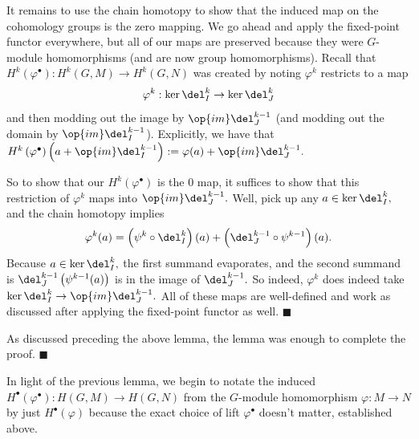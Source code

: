 It remains to use the chain homotopy to show that the induced map on the cohomology groups is the zero mapping. We go ahead and apply the fixed-point functor everywhere, but all of our maps are preserved because they were $G$-module homomorphisms (and are now group homomorphisms). Recall that $H^k\left(\varphi^\bullet\right):H^k(G,M)\to H^k(G,N)$ was created by noting $\varphi^k$ restricts to a map
\[\varphi^k:\ker\del_I^k\to\ker\del_J^k\]
and then modding out the image by $\op{im}\del_J^{k-1}$ (and modding out the domain by $\op{im}\del_I^{k-1}$). Explicitly, we have that $H^k\left(\varphi^\bullet\right)\left(a+\op{im}\del_I^{k-1}\right):=\varphi(a)+\op{im}\del_J^{k-1}.$

So to show that our $H^k\left(\varphi^\bullet\right)$ is the $0$ map, it suffices to show that this restriction of $\varphi^k$ maps into $\op{im}\del_J^{k-1}.$ Well, pick up any $a\in\ker\del_I^k,$ and the chain homotopy implies
\[\varphi^k(a)=\left(\psi^k\circ\del_I^k\right)(a)+\left(\del_J^{k-1}\circ\psi^{k-1}\right)(a).\]
Because $a\in\ker\del_I^k,$ the first summand evaporates, and the second summand is $\del_J^{k-1}\left(\psi^{k-1}(a)\right)$ is in the image of $\del_J^{k-1}.$ So indeed, $\varphi^k$ does indeed take $\ker\del_I^k\to\op{im}\del_J^{k-1}.$ All of these maps are well-defined and work as discussed after applying the fixed-point functor as well. $\blacksquare$

As discussed preceding the above lemma, the lemma was enough to complete the proof. $\blacksquare$

In light of the previous lemma, we begin to notate the induced $H^\bullet\left(\varphi^\bullet\right):H(G,M)\to H(G,N)$ from the $G$-module homomorphism $\varphi:M\to N$ by just $H^\bullet(\varphi)$ because the exact choice of lift $\varphi^\bullet$ doesn't matter, established above.

